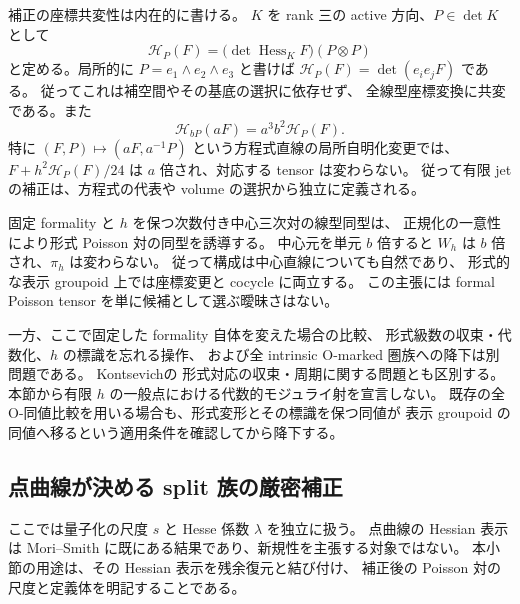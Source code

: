 補正の座標共変性は内在的に書ける。
$K$ を rank 三の active 方向、$P\in\det K$ として
\[
 \mathscr H_{P}(F)
 =\bigl(\det\operatorname{Hess}_{K}F\bigr)(P\otimes P)
\]
と定める。局所的に $P=e_1\wedge e_2\wedge e_3$ と書けば
$\mathscr H_P(F)=\det(e_i e_jF)$ である。
従ってこれは補空間やその基底の選択に依存せず、
全線型座標変換に共変である。また
\[
 \mathscr H_{bP}(aF)=a^3b^2\mathscr H_P(F).
\]
特に $(F,P)\mapsto(aF,a^{-1}P)$ という方程式直線の局所自明化変更では、
$F+h^2\mathscr H_P(F)/24$ は $a$ 倍され、対応する tensor は変わらない。
従って有限 jet の補正は、方程式の代表や volume の選択から独立に定義される。

\begin{remark}[形式的な降下と残る代数化]
固定 formality と $h$ を保つ次数付き中心三次対の線型同型は、
正規化の一意性により形式 Poisson 対の同型を誘導する。
中心元を単元 $b$ 倍すると $W_h$ は $b$ 倍され、$\pi_h$ は変わらない。
従って構成は中心直線についても自然であり、
形式的な表示 groupoid 上では座標変更と cocycle に両立する。
この主張には formal Poisson tensor を単に候補として選ぶ曖昧さはない。

一方、ここで固定した formality 自体を変えた場合の比較、
形式級数の収束・代数化、$h$ の標識を忘れる操作、
および全 intrinsic O-marked 圏族への降下は別問題である。
Kontsevich\cite[Section~2.3, Conjecture~1 and Questions~1]{NFMKontsevichAlg}の
形式対応の収束・周期に関する問題とも区別する。
本節から有限 $h$ の一般点における代数的モジュライ射を宣言しない。
既存の全 O-同値比較を用いる場合も、形式変形とその標識を保つ同値が
表示 groupoid の同値へ移るという適用条件を確認してから降下する。
\end{remark}

\subsection{点曲線が決める split 族の厳密補正}

ここでは量子化の尺度 $s$ と Hesse 係数 $\lambda$ を独立に扱う。
点曲線の Hessian 表示は Mori--Smith\cite[Theorems~1.2, 7.2]{MoriSmith}
に既にある結果であり、新規性を主張する対象ではない。
本小節の用途は、その Hessian 表示を残余復元と結び付け、
補正後の Poisson 対の尺度と定義体を明記することである。

